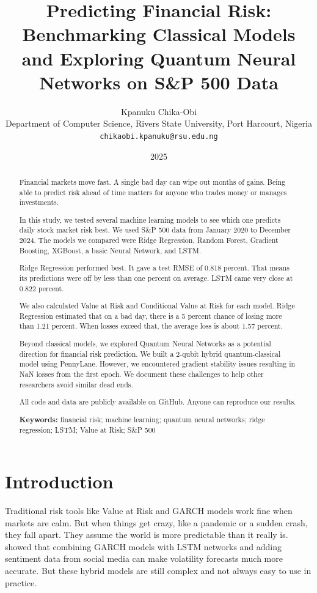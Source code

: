 \documentclass[12pt,a4paper]{article}
\title{Predicting Financial Risk: Benchmarking Classical Models and Exploring Quantum Neural Networks on S\&P 500 Data}
\author{Kpanuku Chika-Obi \\ Department of Computer Science, Rivers State University, Port Harcourt, Nigeria \\ \texttt{chikaobi.kpanuku@rsu.edu.ng}}
\date{2025}
\begin{document}
\maketitle

\begin{abstract}
Financial markets move fast. A single bad day can wipe out months of gains. Being able to predict risk ahead of time matters for anyone who trades money or manages investments.

In this study, we tested several machine learning models to see which one predicts daily stock market risk best. We used S\&P 500 data from January 2020 to December 2024. The models we compared were Ridge Regression, Random Forest, Gradient Boosting, XGBoost, a basic Neural Network, and LSTM.

Ridge Regression performed best. It gave a test RMSE of 0.818 percent. That means its predictions were off by less than one percent on average. LSTM came very close at 0.822 percent.

We also calculated Value at Risk and Conditional Value at Risk for each model. Ridge Regression estimated that on a bad day, there is a 5 percent chance of losing more than 1.21 percent. When losses exceed that, the average loss is about 1.57 percent.

Beyond classical models, we explored Quantum Neural Networks as a potential direction for financial risk prediction. We built a 2-qubit hybrid quantum-classical model using PennyLane. However, we encountered gradient stability issues resulting in NaN losses from the first epoch. We document these challenges to help other researchers avoid similar dead ends.

All code and data are publicly available on GitHub. Anyone can reproduce our results.

\textbf{Keywords:} financial risk; machine learning; quantum neural networks; ridge regression; LSTM; Value at Risk; S\&P 500
\end{abstract}

\section{Introduction}
Traditional risk tools like Value at Risk and GARCH models work fine when markets are calm. But when things get crazy, like a pandemic or a sudden crash, they fall apart. They assume the world is more predictable than it really is. \citet{leber2025} showed that combining GARCH models with LSTM networks and adding sentiment data from social media can make volatility forecasts much more accurate. But these hybrid models are still complex and not always easy to use in practice.
\end{document}
